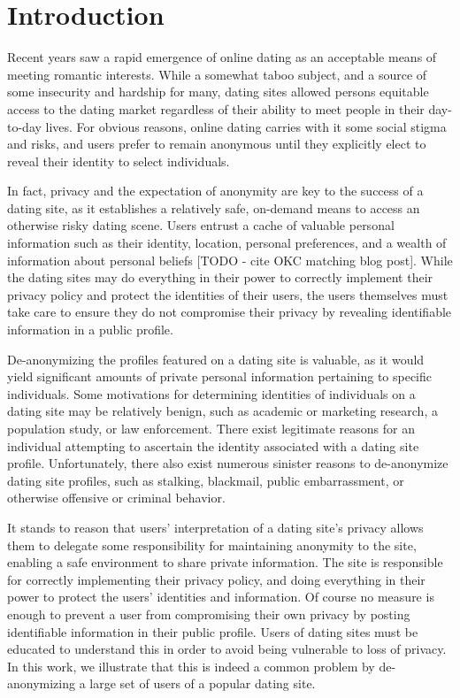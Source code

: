\section{Introduction}
\label{sec:intro}

Recent years saw a rapid emergence of online dating as an acceptable means of meeting romantic interests.
While a somewhat taboo subject, and a source of some insecurity and hardship for many, dating sites allowed persons equitable access to the dating market regardless of their ability to meet people in their day-to-day lives.
For obvious reasons, online dating carries with it some social stigma and risks, and users prefer to remain anonymous until they explicitly elect to reveal their identity to select individuals. 

In fact, privacy and the expectation of anonymity are key to the success of a dating site, as it establishes a relatively safe, on-demand means to access an otherwise risky dating scene.
Users entrust a cache of valuable personal information such as their identity, location, personal preferences, and a wealth of information about personal beliefs [TODO - cite OKC matching blog post].
While the dating sites may do everything in their power to correctly implement their privacy policy and protect the identities of their users, the users themselves must take care to ensure they do not compromise their privacy by revealing identifiable information in a public profile.

De-anonymizing the profiles featured on a dating site is valuable, as it would yield significant amounts of private personal information pertaining to specific individuals.
Some motivations for determining identities of individuals on a dating site may be relatively benign, such as academic or marketing research, a population study, or law enforcement.
There exist legitimate reasons for an individual attempting to ascertain the identity associated with a dating site profile.
Unfortunately, there also exist numerous sinister reasons to de-anonymize dating site profiles, such as stalking, blackmail, public embarrassment, or otherwise offensive or criminal behavior.

It stands to reason that users' interpretation of a dating site's privacy allows them to delegate some responsibility for maintaining anonymity to the site, enabling a safe environment to share private information.
The site is responsible for correctly implementing their privacy policy, and doing everything in their power to protect the users' identities and information.
Of course no measure is enough to prevent a user from compromising their own privacy by posting identifiable information in their public profile.
Users of dating sites must be educated to understand this in order to avoid being vulnerable to loss of privacy.
In this work, we illustrate that this is indeed a common problem by de-anonymizing a large set of users of a popular dating site.

